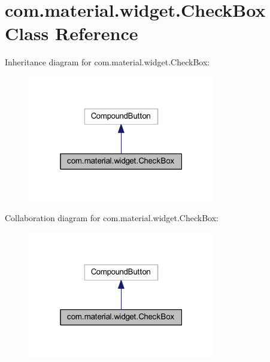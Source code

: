 \hypertarget{classcom_1_1material_1_1widget_1_1_check_box}{}\section{com.\+material.\+widget.\+Check\+Box Class Reference}
\label{classcom_1_1material_1_1widget_1_1_check_box}


Inheritance diagram for com.\+material.\+widget.\+Check\+Box\+:
\nopagebreak
\begin{figure}[H]
\begin{center}
\leavevmode
\includegraphics[width=232pt]{classcom_1_1material_1_1widget_1_1_check_box__inherit__graph}
\end{center}
\end{figure}


Collaboration diagram for com.\+material.\+widget.\+Check\+Box\+:
\nopagebreak
\begin{figure}[H]
\begin{center}
\leavevmode
\includegraphics[width=232pt]{classcom_1_1material_1_1widget_1_1_check_box__coll__graph}
\end{center}
\end{figure}
